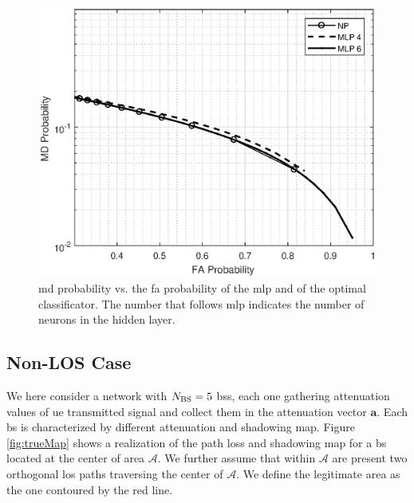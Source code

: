 \documentclass[twocolumns]{IEEEtran}
\begin{document}
 \begin{figure}[h]
     \centering
     \includegraphics[width=1\columnwidth]{FA_MD_LOS.eps}
     \caption{\ac{md} probability vs. the \ac{fa} probability of the \ac{mlp} and of the optimal classificator. The number that follows \ac{mlp} indicates the number of neurons in the hidden layer.}
     \label{fig:NP_comp}
 \end{figure}


\subsection{Non-LOS Case}
We here consider a network with $N_{\rm BS}=5$ \acp{bs}, each one gathering attenuation values of \ac{ue} transmitted signal and collect them in the attenuation vector $\bm{a}$. Each \ac{bs} is characterized by different attenuation and shadowing map. Figure \ref{fig:trueMap} shows a realization of the path loss and shadowing map for a \ac{bs} located at the center of area $\mathcal{A}$. We further assume that within $\mathcal{A}$ are present two orthogonal \ac{los} paths traversing the center of $\mathcal{A}$. We define the legitimate area as the one contoured by the red line.
\end{document}
